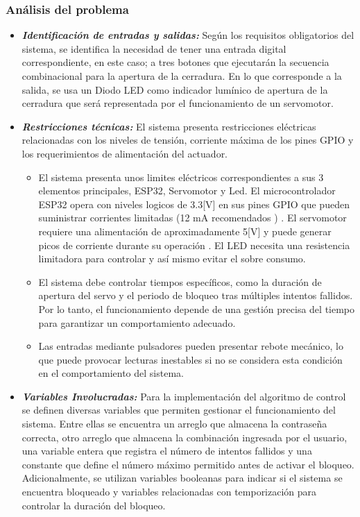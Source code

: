 \subsubsection{\textbf{Análisis del problema}}
\begin{itemize}
    \item \textbf{\textit{Identificación de entradas y salidas:}} Según los requisitos obligatorios del sistema, se identifica la necesidad de tener una entrada digital correspondiente, en este caso; a tres botones que ejecutarán la secuencia combinacional para la apertura de la cerradura. En lo que corresponde a la salida, se usa un Diodo LED como indicador lumínico de apertura de la cerradura que será representada por el funcionamiento de un servomotor. 
    \item \textbf{\textit{Restricciones técnicas:}} El sistema presenta restricciones eléctricas relacionadas con los niveles de tensión, corriente máxima de los pines GPIO y los requerimientos de alimentación del actuador.
    \begin{itemize}
        \item El sistema presenta unos limites eléctricos correspondientes a sus 3 elementos principales, ESP32, Servomotor y Led. El microcontrolador ESP32 opera con niveles logicos de 3.3[V] en sus pines GPIO que pueden suministrar corrientes limitadas (12 mA recomendados \cite{espressif2021esp32}) . El servomotor requiere una alimentación de aproximadamente 5[V] y puede generar picos de corriente durante su operación \cite{wahid2024compact}. El LED necesita una resistencia limitadora para controlar y así mismo evitar el sobre consumo.
        \item El sistema debe controlar tiempos específicos, como la duración de apertura del servo y el periodo de bloqueo tras múltiples intentos fallidos. Por lo tanto, el funcionamiento depende de una gestión precisa del tiempo para garantizar un comportamiento adecuado.
        \item Las entradas mediante pulsadores pueden presentar rebote mecánico, lo que puede provocar lecturas inestables si no se considera esta condición en el comportamiento del sistema.
    \end{itemize}
    \item \textbf{\textit{Variables Involucradas:}} Para la implementación del algoritmo de control se definen diversas variables que permiten gestionar el funcionamiento del sistema. Entre ellas se encuentra un arreglo que almacena la contraseña correcta, otro arreglo que almacena la combinación ingresada por el usuario, una variable entera que registra el número de intentos fallidos y una constante que define el número máximo permitido antes de activar el bloqueo. Adicionalmente, se utilizan variables booleanas para indicar si el sistema se encuentra bloqueado y variables relacionadas con temporización para controlar la duración del bloqueo.
\end{itemize}

